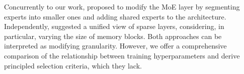 Concurrently to our work, \cite{dai2024deepseekmoe} proposed to modify the MoE layer by segmenting experts into smaller ones and adding shared experts to the architecture. Independently, \cite{liu2023unified} suggested a unified view of sparse \ff{} layers, considering, in particular, varying the size of memory blocks. Both approaches can be interpreted as modifying granularity.  However, we offer a comprehensive comparison of the relationship between training hyperparameters and derive principled selection criteria, which they lack.

